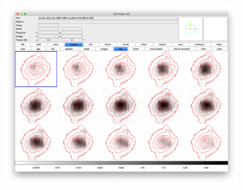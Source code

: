 \documentclass{aa}
\begin{document}
\begin{figure}[!t]
\centering
\includegraphics[width=0.9\textwidth]{ha-maps.png}
  \caption{  }
\end{figure}
\end{document}
